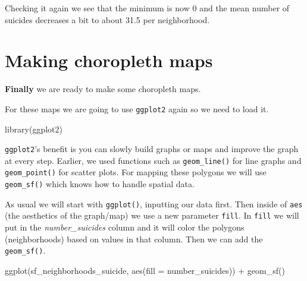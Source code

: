 \documentclass[
]{krantz}
\makeatletter
\newenvironment{Shaded}{\begin{snugshade}}{\end{snugshade}}
\newcommand{\AttributeTok}[1]{\textcolor[rgb]{0.61,0.61,0.61}{#1}}
\newcommand{\CommentTok}[1]{\textcolor[rgb]{0.37,0.37,0.37}{\textit{#1}}}
\newcommand{\FunctionTok}[1]{\textcolor[rgb]{0,0,0}{#1}}
\newcommand{\NormalTok}[1]{#1}
\newcommand{\SpecialCharTok}[1]{\textcolor[rgb]{0,0,0}{#1}}
\newenvironment{kframe}{%
\medskip{}
\setlength{\fboxsep}{.8em}
 \def\at@end@of@kframe{}%
 \ifinner\ifhmode%
  \def\at@end@of@kframe{\end{minipage}}%
  \begin{minipage}{\columnwidth}%
 \fi\fi%
 \def\FrameCommand##1{\hskip\@totalleftmargin \hskip-\fboxsep
 \colorbox{shadecolor}{##1}\hskip-\fboxsep
     \hskip-\linewidth \hskip-\@totalleftmargin \hskip\columnwidth}%
 \MakeFramed {\advance\hsize-\width
   \@totalleftmargin\z@ \linewidth\hsize
   \@setminipage}}%
 {\par\unskip\endMakeFramed%
 \at@end@of@kframe}
\renewenvironment{Shaded}{\begin{kframe}}{\end{kframe}}
\makeatother
\begin{document}
Checking it again we see that the minimum is now 0 and the mean number of suicides decreases a bit to about 31.5 per neighborhood.

\begin{Shaded}
\end{Shaded}

\hypertarget{making-choropleth-maps}{%
\section{Making choropleth maps}\label{making-choropleth-maps}}

\textbf{Finally} we are ready to make some choropleth maps.

For these maps we are going to use \texttt{ggplot2} again so we need to load it.

\begin{Shaded}
\begin{Highlighting}[]
\FunctionTok{library}\NormalTok{(ggplot2)}
\end{Highlighting}
\end{Shaded}

\texttt{ggplot2}'s benefit is you can slowly build graphs or maps and improve the graph at every step. Earlier, we used functions such as \texttt{geom\_line()} for line graphs and \texttt{geom\_point()} for scatter plots. For mapping these polygons we will use \texttt{geom\_sf()} which knows how to handle spatial data.

As usual we will start with \texttt{ggplot()}, inputting our data first. Then inside of \texttt{aes} (the aesthetics of the graph/map) we use a new parameter \texttt{fill}. In \texttt{fill} we will put in the \emph{number\_suicides} column and it will color the polygons (neighborhoods) based on values in that column. Then we can add the \texttt{geom\_sf()}.

\begin{Shaded}
\begin{Highlighting}[]
\FunctionTok{ggplot}\NormalTok{(sf\_neighborhoods\_suicide, }\FunctionTok{aes}\NormalTok{(}\AttributeTok{fill =}\NormalTok{ number\_suicides)) }\SpecialCharTok{+}
  \FunctionTok{geom\_sf}\NormalTok{() }
\end{Highlighting}
\end{Shaded}
\end{document}
